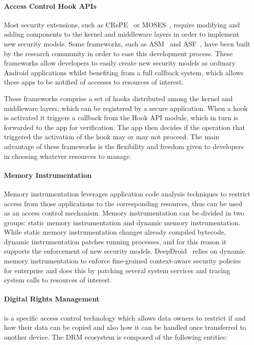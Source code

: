 \paragraph{\textbf{Access Control Hook APIs}}

Most security extensions, such as CRePE~\cite{conti2011crepe} or MOSES~\cite{russello2012moses}, require modifying and adding components to the kernel and middleware layers in order to implement new security models. Some frameworks, such as \ac{ASM}~\cite{heuser2014asm} and \ac{ASF}~\cite{backes2014android}, have been built by the research community in order to ease this development process. These frameworks allow developers to easily create new security models as ordinary Android applications whilst benefiting from a full callback system, which allows these apps to be notified of accesses to resources of interest.

These frameworks comprise a set of hooks distributed among the kernel and middleware layers, which can be registered by a secure application. When a hook is activated it triggers a callback from the Hook API module, which in turn is forwarded to the app for verification. The app then decides if the operation that triggered the activation of the hook may or may not proceed. The main advantage of these frameworks is the flexibility and freedom given to developers in choosing whatever resources to manage.

\paragraph{\textbf{Memory Instrumentation}}

Memory instrumentation leverages application code analysis techniques to restrict access from those applications to the corresponding resources, thus can be used as an access control mechanism. Memory instrumentation can be divided in two groups: static memory instrumentation and dynamic memory instrumentation. While static memory instrumentation changes already compiled bytecode, dynamic instrumentation patches running processes, and for this reason it supports the enforcement of new security models. DeepDroid~\cite{wang2015deepdroid} relies on dynamic memory instrumentation to enforce fine-grained context-aware security policies for enterprise and does this by patching several system services and tracing system calls to resources of interest.

\paragraph{\textbf{Digital Rights Management}} is a specific access control technology which allows data owners to restrict if and how their data can be copied and also how it can be handled once transferred to another device. The \ac{DRM} ecosystem is composed of the following entities:

